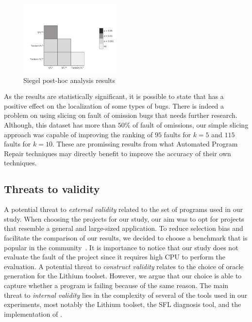 \documentclass{article}
\begin{document}
\begin{figure}[h]
	\vspace{-1.8cm}
		\includegraphics[width=0.45\textwidth]{figures/heatmap_nemenyi_result.pdf}
		\caption{Siegel post-hoc analysis results}
		\label{fig:performance}
		\vspace{-0.3cm}
\end{figure}

As the results are statistically significant, it is possible to state
that  has a positive effect on the localization of some
types of bugs. There is indeed a problem on using slicing on fault of
omission bugs that needs further research.  Although, this dataset has
more than $50\%$ of fault of omissions, our simple slicing approach
was capable of improving the ranking of $95$ faults for $k=5$ and
$115$ faults for $k=10$. These are promissing results from what Automated
Program Repair techniques may directly benefit to improve the accuracy
of their own techniques.


\subsection{Threats to validity}
%
A potential threat to \textit{external validity} related to the set of programs used in
our study. When choosing the projects for our study, our aim was to opt for
projects that resemble a general and large-sized application. To reduce
selection bias and facilitate the comparison of our results, we decided to
choose a benchmark that is popular in the community~\cite{just-defects4j-issta2014}.
It is importance to notice that our study does not evaluate the fault of the \closure{}
project since it requires high CPU to perform the  evaluation. A potential
threat to \textit{construct validity} relates to the choice of oracle generation
for the Lithium toolset. However, we argue that our choice is able to capture whether
a program is failing because of the same reason.
The main threat to \textit{internal validity} lies in the complexity of several of the tools
used in our experiments, most notably the Lithium toolset, the SFL diagnosis tool,
and the implementation of \comb{}.
%
\end{document}
